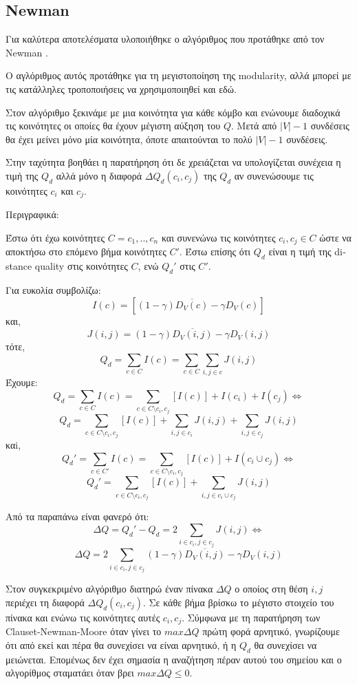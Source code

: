 \documentclass[12pt, letterpaper]{article}
\newcommand{\en}{\selectlanguage{english}}
\newcommand{\gr}{\selectlanguage{greek}}
\begin{document}
\subsection{\textlatin{Newman}}

Για καλύτερα αποτελέσματα υλοποιήθηκε ο αλγόριθμος που προτάθηκε από τον \textlatin{Newman} 
\cite{Newman}\relax. 

Ο αγλόριθμος αυτός προτάθηκε για τη μεγιστοποίηση της \en modularity, \gr αλλά μπορεί με τις κατάλληλες τροποποιήσεις να χρησιμοποιηθεί και εδώ.

Στον αλγόριθμο ξεκινάμε με μια κοινότητα για κάθε κόμβο και ενώνουμε διαδοχικά τις κοινότητες οι οποίες θα έχουν μέγιστη αύξηση του $Q$. Μετά από $|V|-1$ συνδέσεις
θα έχει μείνει μόνο μία κοινότητα, όποτε απαιτούνται το πολύ $|V|-1$ συνδέσεις. 

Στην ταχύτητα βοηθάει η παρατήρηση ότι δε χρειάζεται να υπολογίζεται συνέχεια η τιμή της $Q_d$ αλλά μόνο η διαφορά $\Delta Q_d(c_i,c_j)$ της $Q_d$ αν συνενώσουμε τις 
κοινότητες $c_i$ και $c_j$. 


Περιγραφικά:

Έστω ότι έχω κοινότητες $C = {c_1,..,c_n}$ και συνενώνω τις κοινότητες $c_i,c_j \in C$ ώστε να αποκτήσω
στο επόμενο βήμα κοινότητες $C'$. Έστω επίσης ότι $Q_d$ είναι η τιμή της \textlatin{distance quality}
στις κοινότητες $C$, ενώ $Q_d'$ στις $C'$. 



Για ευκολία συμβολίζω: 
\[ I(c) = [(1 - \gamma)\overline{ D_V(c) } - \gamma D_V(c)] \]
και,
\[ J(i,j) = (1-\gamma) \overline{ D_V(i,j)} - \gamma D_V(i,j) \]
τότε,
\[ Q_d = \sum_{c \in C} I(c) =\sum_{c \in C} \sum_{i,j \in c} J(i,j) \]
Έχουμε:
\[ Q_d  = \sum_{c \in C} I(c) =  \sum_{c \in C \setminus c_i,c_j}[I(c)] + I(c_i) + I(c_j) \Leftrightarrow\]
\[ Q_d = \sum_{c \in C \setminus c_i,c_j}[I(c)] + \sum_{i,j \in c_i}J(i,j) + \sum_{i,j \in c_j}J(i,j)  \]
καi,
\[ Q_d' = \sum_{c \in C'} I(c) =  \sum_{c \in C \setminus c_i,c_j}[I(c)] + I(c_i \cup c_j) \Leftrightarrow \]
\[ Q_d' =  \sum_{c \in C \setminus c_i,c_j}[I(c)] + \sum_{i,j \in c_i \cup c_j} J(i,j) \]



Από τα παραπάνω είναι φανερό ότι:
\[   \Delta Q = Q_d' - Q_d = 2 \sum_{i \in c_i, j \in c_j} J(i,j) \Leftrightarrow \]
\[ \Delta Q = 2 \sum_{i \in c_i, j \in c_j} (1-\gamma) \overline{ D_V(i,j)} - \gamma D_V(i,j) \]



Στον συγκεκριμένο αλγόριθμο διατηρώ έναν πίνακα $\Delta Q$ ο οποίος στη θέση $i,j$ περιέχει τη διαφορά $\Delta Q_d (c_i,c_j)$. 
Σε κάθε βήμα βρίσκω το μέγιστο στοιχείο του πίνακα και ενώνω τις κοινότητες αυτές $c_i,c_j$. Σύμφωνα με τη παρατήρηση των 
\en Clauset-Newman-Moore \gr \cite{Clauset:fastgreedy} όταν γίνει το $max \Delta Q$ πρώτη φορά αρνητικό, γνωρίζουμε ότι από εκεί και πέρα θα συνεχίσει
να είναι αρνητικό, ή η $Q_d$ θα συνεχίσει να μειώνεται. Επομένως δεν έχει σημασία η αναζήτηση πέραν αυτού του σημείου και ο αλγορίθμος σταματάει όταν 
βρει $max \Delta Q \leq 0$. 
 
\end{document}
